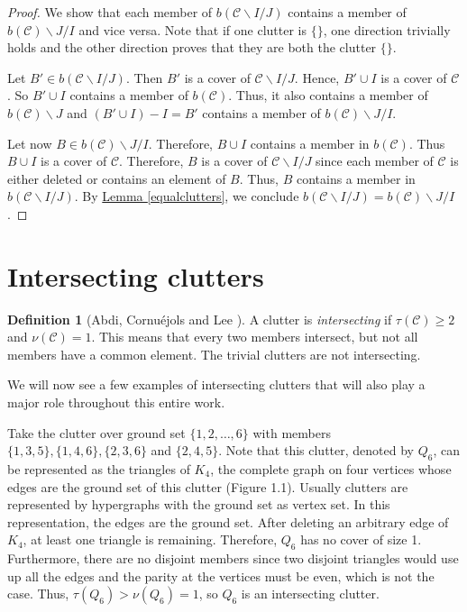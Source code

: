 \documentclass[a4paper, 12pt]{scrbook}
\theoremstyle{definition}
\newtheorem*{definition}{Definition}
\begin{document}
\begin{proof}
    We show that each member of $b(\mathcal{C}\backslash I /J)$ contains a member of $b(\mathcal{C}) \backslash J /I$ and vice versa.
    Note that if one clutter is $\{\}$, one direction trivially holds and the other direction proves that they are both the clutter $\{\}$.

    Let $B' \in b(\mathcal{C}\backslash I /J)$.
    Then $B'$ is a cover of $\mathcal{C}\backslash I /J$.
    Hence, $B' \cup I$ is a cover of $\mathcal{C}$.
    So $B' \cup I$ contains a member of $b(\mathcal{C})$. Thus, it also contains a member of $b(\mathcal{C})\backslash J$ and $(B' \cup I)-I=B'$ contains a member of $b(\mathcal{C})\backslash J /I$.

    Let now $B \in b(\mathcal{C})\backslash J/I$. Therefore, $B \cup I$ contains a member in $b(\mathcal{C})$. Thus $B \cup I$ is a cover of $\mathcal{C}$. Therefore, $B$ is a cover of $\mathcal{C}\backslash I /J$ since each member of $\mathcal{C}$ is either deleted or contains an element of $B$. Thus, $B$ contains a member in $b(\mathcal{C}\backslash I /J)$.
    By \hyperref[equalclutters]{Lemma \ref*{equalclutters}}, we conclude $b(\mathcal{C}\backslash I /J) = b(\mathcal{C}) \backslash J / I$.
\end{proof}


\section{Intersecting clutters}
\begin{definition}[Abdi, Cornuéjols and Lee \cite{restrictions}]
    A clutter is \emph{intersecting} if $\tau(\mathcal{C}) \geq 2$ and $\nu(\mathcal{C}) = 1$.
    This means that every two members intersect, but not all members have a common element.
    The trivial clutters are not intersecting.
\end{definition}

We will now see a few examples of intersecting clutters that will also play a major role throughout this entire work.

Take the clutter over ground set $\{1,2,\ldots,6\}$ with members $\{1,3,5\}, \{1,4,6\}, \{2,3,6\}$ and $\{2,4,5\}$.
Note that this clutter, denoted by $Q_6$\cite{q6}, can be represented as the triangles of $K_4$, the complete graph on four vertices whose edges are the ground set of this clutter (Figure 1.1). Usually clutters are represented by hypergraphs with the ground set as vertex set. In this representation, the edges are the ground set.
After deleting an arbitrary edge of $K_4$, at least one triangle is remaining.
Therefore, $Q_6$ has no cover of size 1.
Furthermore, there are no disjoint members since two disjoint triangles would use up all the edges and the parity at the vertices must be even, which is not the case.
Thus, $\tau(Q_6) > \nu(Q_6) = 1$, so $Q_6$ is an intersecting clutter.
\end{document}
